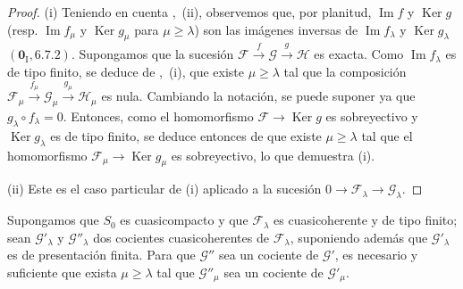 \begin{proof}
(i) Teniendo en cuenta ,~(ii), observemos que, por planitud, $\operatorname{Im}f$ y $\operatorname{Ker}g$ (resp. $\operatorname{Im}f_\mu$ y $\operatorname{Ker}g_\mu$ para $\mu\geq\lambda$) son las imágenes inversas de $\operatorname{Im}f_\lambda$ y $\operatorname{Ker}g_\lambda$ $(\mathbf{0}_{\mathrm I},6.7.2)$. Supongamos que la sucesión $\mathcal F\xrightarrow{f}\mathcal G\xrightarrow{g}\mathcal H$ es exacta. Como $\operatorname{Im}f_\lambda$ es de tipo finito, se deduce de ,~(i), que existe $\mu\geq\lambda$ tal que la composición $\mathcal F_\mu\xrightarrow{f_\mu}\mathcal G_\mu
  \xrightarrow{g_\mu}\mathcal H_\mu$ es nula. Cambiando la notación, se puede suponer ya que $g_\lambda\circ f_\lambda=0$. Entonces, como el homomorfismo $\mathcal F\to\operatorname{Ker}g$ es sobreyectivo y $\operatorname{Ker}g_\lambda$ es de tipo finito, se deduce entonces de  que existe $\mu\geq\lambda$ tal que el homomorfismo $\mathcal F_\mu\to\operatorname{Ker}g_\mu$ es sobreyectivo, lo que demuestra (i).

(ii) Este es el caso particular de (i) aplicado a la sucesión $0\to\mathcal F_\lambda\to\mathcal G_\lambda$.
\end{proof}

\begin{lemma}[8.5.9]
\label{IV.8.5.9-fr}
Supongamos que $S_0$ es cuasicompacto y que $\mathcal F_\lambda$ es cuasicoherente y de tipo finito; sean $\mathcal G'_\lambda$ y $\mathcal G''_\lambda$ dos cocientes cuasicoherentes de $\mathcal F_\lambda$, suponiendo además que $\mathcal G'_\lambda$ es de presentación finita. Para que $\mathcal G''$ sea un cociente de $\mathcal G'$, es necesario y suficiente que exista $\mu\geq\lambda$ tal que $\mathcal G''_\mu$ sea un cociente de $\mathcal G'_\mu$.
\end{lemma}

